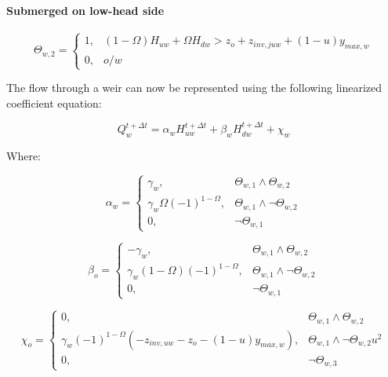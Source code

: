 \documentclass[11pt]{article}
\begin{document}
\paragraph{Submerged on low-head side}

\begin{equation}
  \Theta_{w,2} =
  \begin{cases}
    1, & (1 - \Omega) H_{uw} + \Omega H_{dw} > z_o + z_{inv,juw} + (1 - u) y_{max,w} \\
    0, & o/w
  \end{cases}
\end{equation}

The flow through a weir can now be represented using the following linearized
coefficient equation:

\begin{equation}
 Q_{w}^{t + \Delta t} = \alpha_{w} H_{uw}^{t + \Delta t} + \beta_{w} H_{dw}^{t + \Delta t} + \chi_{w} 
\end{equation}

Where:

\begin{equation}
  \alpha_{w} =
  \begin{cases}
   \gamma_w, & \Theta_{w,1} \land \Theta_{w,2}\\
   \gamma_w \Omega (-1)^{1 - \Omega}, & \Theta_{w,1} \land \lnot \Theta_{w,2}\\
   0, & \lnot \Theta_{w,1}
  \end{cases}
\end{equation}

\begin{equation}
  \beta_{o} =
  \begin{cases}
   -\gamma_w, & \Theta_{w,1} \land \Theta_{w,2}\\
   \gamma_w (1 - \Omega) (-1)^{1 - \Omega}, & \Theta_{w,1} \land \lnot \Theta_{w,2}\\
   0, & \lnot \Theta_{w,1}
  \end{cases}
\end{equation}

\begin{equation}
  \chi_{o} =
  \begin{cases}
   0, & \Theta_{w,1} \land \Theta_{w,2}\\
   \gamma_w (-1)^{1 - \Omega} (- z_{inv,uw} - z_o - (1 - u) y_{max,w}), & \Theta_{w,1} \land \lnot \Theta_{w,2} u^2\\
   0, & \lnot \Theta_{w,3}
  \end{cases}
\end{equation}
\end{document}
